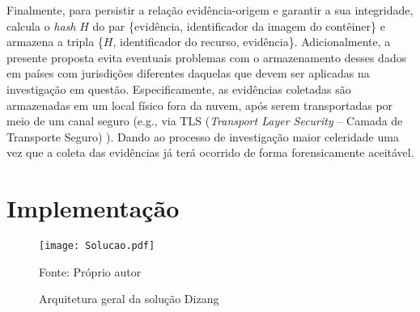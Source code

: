 Finalmente, para persistir a relação evidência-origem e garantir a sua integridade, \fancyname calcula o \textit{hash} $H$ do par \{evidência, identificador da imagem do contêiner\} e armazena a tripla \{$H$, identificador do recurso, evidência\}.
%
Adicionalmente, a presente proposta evita eventuais problemas com o armazenamento desses dados em países com jurisdições diferentes daquelas que devem ser aplicadas na investigação em questão.
%
Especificamente, as evidências coletadas são armazenadas em um local físico fora da nuvem, após serem transportadas por meio de um canal seguro (e.g., via TLS (\textit{Transport Layer Security} -- Camada de Transporte Seguro) \cite{DierksT2008}).
%
Dando ao processo de investigação maior celeridade uma vez que a coleta das evidências já terá ocorrido de forma forensicamente aceitável.
%

\section{Implementação}
\label{sec:proposta-impl}


\begin{figure}[htb!]
\footnotesize
\caption{Arquitetura geral da solução Dizang}
\texttt{[image: Solucao.pdf]}
\centering
\label{fig:Solucao}
\begin{center}
Fonte: Próprio autor 
\end{center}
\end{figure}

